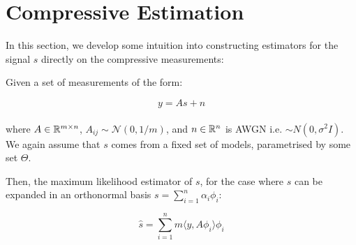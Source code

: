 \section{Compressive Estimation} \label{sec:estimation}
In this section, we develop some intuition into constructing estimators for the signal \(s\) directly on the compressive measurements:

\begin{theorem}

Given a set of measurements of the form:

\begin{equation}
y = As + n
\end{equation}
\\
where \(A \in {\mathbb{R}}^{m \times n} \), \(A_{ij} \sim \mathcal{N}\left(0,1/m\right)\), and \(n \in {\mathbb{R}}^n\) is AWGN i.e. \(\sim N\left(0, \sigma^2 I\right)\). We again assume that \(s\) comes from a fixed set of models, parametrised by some set \(\Theta\). 

Then, the maximum likelihood estimator of \(s\), for the case where \(s\) can be expanded in an orthonormal basis \(s = \sum_{i=1}^n \alpha_i\phi_i\):

\begin{equation}
\hat{s} = \sum_{i=1}^n m\langle y, A\phi_i\rangle \phi_i
\end{equation}

\end{theorem}
